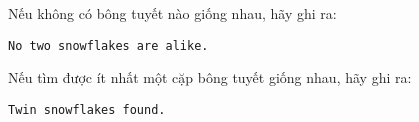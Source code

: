 Nếu không có bông tuyết nào giống nhau, hãy ghi ra:  
\begin{verbatim}
No two snowflakes are alike.\end{verbatim}

   Nếu tìm được ít nhất một cặp bông tuyết giống nhau, hãy ghi ra:  
\begin{verbatim}
Twin snowflakes found.\end{verbatim}